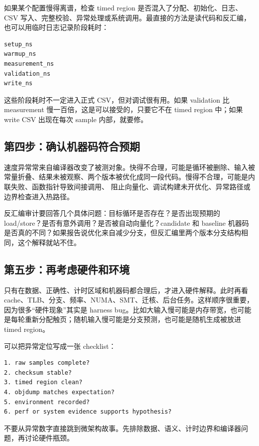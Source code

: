 如果某个配置慢得离谱，检查 timed region 是否混入了分配、初始化、日志、CSV 写入、完整校验、异常处理或系统调用。最直接的方法是读代码和反汇编，也可以用临时日志记录阶段耗时：

\begin{lstlisting}
setup_ns
warmup_ns
measurement_ns
validation_ns
write_ns
\end{lstlisting}

这些阶段耗时不一定进入正式 CSV，但对调试很有用。如果 validation 比 measurement 慢一百倍，这是可以接受的，只要它不在 timed region 中；如果 write CSV 出现在每次 sample 内部，就要修。

\subsection{第四步：确认机器码符合预期}

速度异常常来自编译器改变了被测对象。快得不合理，可能是循环被删除、输入被常量折叠、结果未被观察、两个版本被优化成同一段代码。慢得不合理，可能是内联失败、函数指针导致间接调用、 阻止向量化、调试构建未开优化、异常路径或边界检查进入热路径。

反汇编审计要回答几个具体问题：目标循环是否存在？是否出现预期的 load/store？是否有意外调用？是否被自动向量化？candidate 和 baseline 机器码是否真的不同？如果报告说优化来自减少分支，但反汇编里两个版本分支结构相同，这个解释就站不住。

\subsection{第五步：再考虑硬件和环境}

只有在数据、正确性、计时区域和机器码都合理后，才进入硬件解释。此时再看 cache、TLB、分支、频率、NUMA、SMT、迁核、后台任务。这样顺序很重要，因为很多“硬件现象”其实是 harness bug。比如大输入慢可能是内存带宽，也可能是每轮重新分配触页；随机输入慢可能是分支预测，也可能是随机生成被放进 timed region。

可以把异常定位写成一张 checklist：

\begin{lstlisting}
1. raw samples complete?
2. checksum stable?
3. timed region clean?
4. objdump matches expectation?
5. environment recorded?
6. perf or system evidence supports hypothesis?
\end{lstlisting}

\begin{warningbox}
不要从异常数字直接跳到微架构故事。先排除数据、语义、计时边界和编译器问题，再讨论硬件瓶颈。
\end{warningbox}

